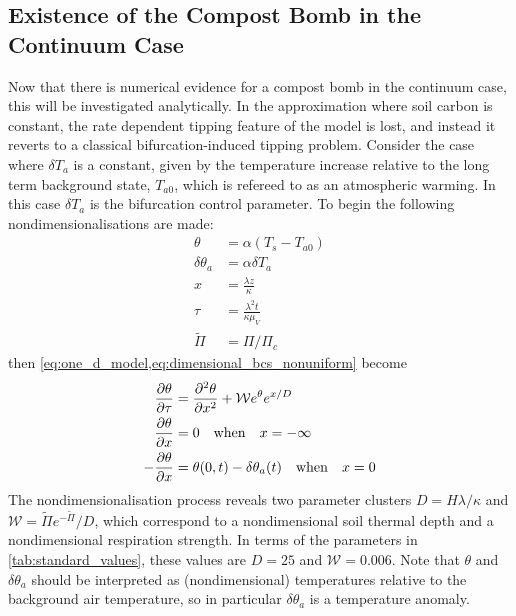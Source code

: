 \subsection{Existence of the Compost Bomb in the Continuum Case}
\label{sec:existence_of_compost_bomb}
Now that there is numerical evidence for a compost bomb in the continuum case, this will be investigated analytically. In the approximation where soil carbon is constant,
the rate dependent tipping feature of the model is lost, and instead it reverts to a classical bifurcation-induced tipping problem.
Consider the case where $\delta T_a$ is a constant, given by the temperature increase relative to the long term background state, $T_{a0}$, which is refereed to as an atmospheric warming.
In this case $\delta T_a$ is the bifurcation control parameter.
To begin the following nondimensionalisations are made:
\begin{subequations}
  \label{eq:nondimensionalisations}
  \begin{align}
    \theta &= \alpha\left(T_s - T_{a0}\right) \label{subeq:nondimensionalisations_soil_temperature}\\
    \delta\theta_a &= \alpha \delta T_a \label{subeq:nondimensionalisations_air_temperature}\\
    x &= \frac{\lambda z}{\kappa}  \label{subeq:nondimensionalisations_depth}\\
    \tau &= \frac{\lambda^2 t}{\kappa\mu_V} \label{subeq:nondimensionalisations_time}\\
    \widetilde{\Pi} &= \Pi/\Pi_c \label{subeq:nondimensionalisations_npp}
  \end{align}
\end{subequations}
then \cref{eq:one_d_model,eq:dimensional_bcs_nonuniform} become
\begin{subequations}
  \label{eq:nondimensional_model_nonuniform}
  \begin{align}
  \pdv{\theta}{\tau} &= \pdv[2]{\theta}{x} + \mathcal{W} e^{\theta}e^{x/D} \label{subeq:nondimensional_model_nonuniform_reaction_diffusion}\\
  \pdv{\theta}{x} &= 0\quad \mathrm{when} \quad x=-\infty \label{subeq:nondimensional_model_nonuniform_bcs_upper}\\
  -\pdv{\theta}{x} &= \theta(0,t) - \delta\theta_a(t) \quad \mathrm{when} \quad x=0             \label{subeq:nondimensional_model_nonuniform_bcs_lower}
  \end{align}
\end{subequations}
The nondimensionalisation process reveals two parameter clusters $D = H\lambda/\kappa$ and $\mathcal{W} = \widetilde{\Pi}e^{-\widetilde{\Pi}}/D$, which
correspond to a nondimensional soil thermal depth and a nondimensional respiration strength. In terms of the parameters in \cref{tab:standard_values},
these values are $D = 25$ and $\mathcal{W} = 0.006$.
Note that $\theta$ and $\delta\theta_a$ should be interpreted as (nondimensional) temperatures
relative to the background air temperature, so in particular $\delta\theta_a$ is a temperature anomaly.

